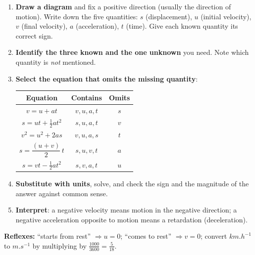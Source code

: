 \documentclass[11pt]{article}
\newcommand{\cle}[1]{{\popxbold\color{popdark}#1}}
\begin{document}
\begin{methode}
\begin{enumerate}
\item \textbf{Draw a diagram} and fix a positive direction (usually the direction of motion). Write down the five quantities: $s$ (displacement), $u$ (initial velocity), $v$ (final velocity), $a$ (acceleration), $t$ (time). Give each known quantity its correct sign.
\item \textbf{Identify the three known and the one unknown} you need. Note which quantity is \emph{not} mentioned.
\item \textbf{Select the equation that omits the missing quantity}:
\begin{center}
\begin{tabular}{|c|c|c|}
\hline
\rowcolor{popblueL} Equation & Contains & Omits \\
\hline
$v = u + at$ & $v,u,a,t$ & $s$ \\
\hline
$s = ut + \tfrac{1}{2}at^{2}$ & $s,u,a,t$ & $v$ \\
\hline
$v^{2} = u^{2} + 2as$ & $v,u,a,s$ & $t$ \\
\hline
$s = \dfrac{(u+v)}{2}\,t$ & $s,u,v,t$ & $a$ \\
\hline
$s = vt - \tfrac{1}{2}at^{2}$ & $s,v,a,t$ & $u$ \\
\hline
\end{tabular}
\end{center}
\item \textbf{Substitute with units}, solve, and check the sign and the magnitude of the answer against common sense.
\item \textbf{Interpret}: a negative velocity means motion in the negative direction; a negative acceleration opposite to motion means a \cle{retardation} (deceleration).
\end{enumerate}
\textbf{Reflexes:} ``starts from rest'' $\Rightarrow u=0$; ``comes to rest'' $\Rightarrow v=0$; convert $\si{km.h^{-1}}$ to $\si{m.s^{-1}}$ by multiplying by $\tfrac{1000}{3600}=\tfrac{5}{18}$.
\end{methode}
\end{document}
